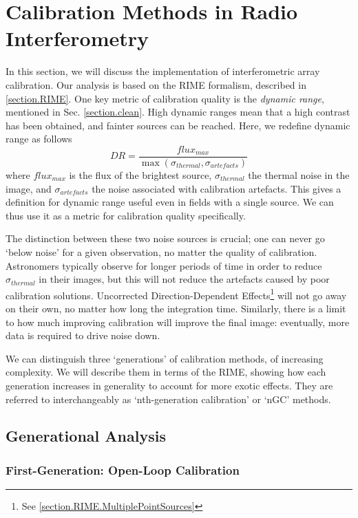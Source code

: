 
\section{Calibration Methods in Radio Interferometry}\label{section.calibration}
\pg
In this section, we will discuss the implementation of interferometric array calibration. Our analysis is based on the RIME formalism, described in \cref{section.RIME}. One key metric of calibration quality is the \emph{dynamic range}, mentioned in Sec. \ref{section.clean}. High dynamic ranges mean that a high contrast has been obtained, and fainter sources can be reached. Here, we redefine dynamic range as follows
\begin{equation}\label{eq.DR}
DR = \frac{flux_{max}}{\max(\sigma_{thermal},\sigma_{artefacts})}
\end{equation}
where $flux_{max}$ is the flux of the brightest source, $\sigma_{thermal}$ the thermal noise in the image, and $\sigma_{artefacts}$ the noise associated with calibration artefacts. This gives a definition for dynamic range useful even in fields with a single source. We can thus use it as a metric for calibration quality specifically.

\pg
The distinction between these two noise sources is crucial; one can never go `below noise' for a given observation, no matter the quality of calibration. Astronomers typically observe for longer periods of time in order to reduce $\sigma_{thermal}$ in their images, but this will not reduce the artefacts caused by poor calibration solutions. Uncorrected Direction-Dependent Effects\footnote{See \cref{section.RIME.MultiplePointSources}} will not go away on their own, no matter how long the integration time. Similarly, there is a limit to how much improving calibration will improve the final image: eventually, more data is required to drive noise down.

\pg
We can distinguish three `generations' of calibration methods, of increasing complexity. We will describe them in terms of the RIME, showing how each generation increases in generality to account for more exotic effects. They are referred to interchangeably as `nth-generation calibration' or `nGC' methods.

\subsection{Generational Analysis}

\subsubsection{First-Generation: Open-Loop Calibration}\label{section.calibration.1gc}

